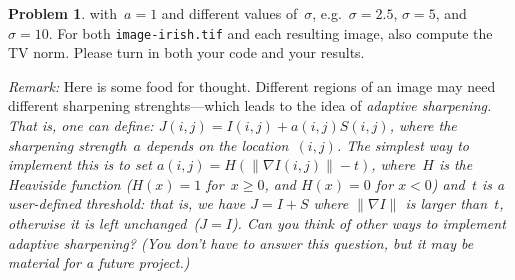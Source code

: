 \documentclass[11pt]{article}
\theoremstyle{plain}
\theoremstyle{definition}
\newtheorem{problem}{Problem}
\theoremstyle{remark}
\begin{document}
\begin{problem}
with~$a=1$ and different values of~$\sigma$, e.g.~$\sigma=2.5$, 
$\sigma=5$, and 
$\sigma=10$. 
For both \verb+image-irish.tif+ and each resulting
image, also compute the TV norm.
Please turn in both your code and your results.
\par\vspace{.15cm}
{\em Remark:} 
Here is some food for thought. Different regions of
an image may need different sharpening strenghts---which leads to
the idea of \em adaptive sharpening\em. That is, 
one can define: $J(i,j)=I(i,j)+a(i,j)S(i,j)$,
where the sharpening strength~$a$ depends on the location~$(i,j)$.
The simplest way to implement this is to set
$a(i,j)=H(\|\nabla I(i,j)\|-t)$, where~$H$ is 
the Heaviside function ($H(x)=1$ for~$x\geq0$, and $H(x)=0$
for $x<0$) and~$t$ is a user-defined threshold:
that is, we have $J=I+S$ where $\|\nabla I\|$ 
is larger than~$t$, otherwise it is left unchanged~($J=I$).
Can you think of other ways to implement adaptive sharpening?
(You don't have to answer this question,
but it may be material for a future project.) 
\end{problem}
\end{document}
